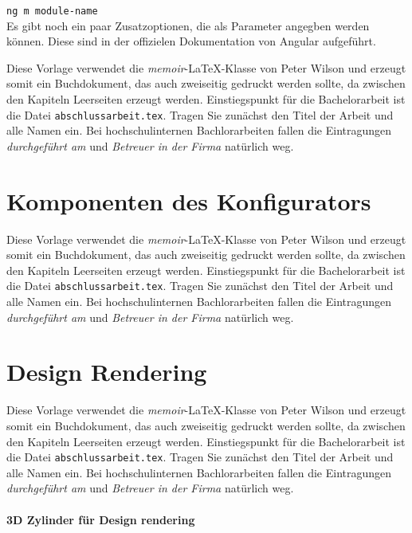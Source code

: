 \texttt{ng m module-name}\\

Es gibt noch ein paar Zusatzoptionen, die als Parameter angegben werden können. Diese sind in der offizielen Dokumentation von Angular aufgeführt.
 
Diese Vorlage verwendet die \textit{memoir}-LaTeX-Klasse von Peter Wilson und erzeugt somit ein Buchdokument, das auch zweiseitig gedruckt werden sollte, da zwischen den Kapiteln Leerseiten erzeugt werden. Einstiegspunkt für die Bachelorarbeit ist die Datei \texttt{abschlussarbeit.tex}. Tragen Sie zunächst den Titel der Arbeit und alle Namen ein. Bei hochschulinternen Bachlorarbeiten fallen die Eintragungen \textit{durchgeführt am} und \textit{Betreuer in der Firma} natürlich weg.

\section{Komponenten des Konfigurators}
\label{sec:umsetzung}
%
Diese Vorlage verwendet die \textit{memoir}-LaTeX-Klasse von Peter Wilson und erzeugt somit ein Buchdokument, das auch zweiseitig gedruckt werden sollte, da zwischen den Kapiteln Leerseiten erzeugt werden. Einstiegspunkt für die Bachelorarbeit ist die Datei \texttt{abschlussarbeit.tex}. Tragen Sie zunächst den Titel der Arbeit und alle Namen ein. Bei hochschulinternen Bachlorarbeiten fallen die Eintragungen \textit{durchgeführt am} und \textit{Betreuer in der Firma} natürlich weg.

\section{Design Rendering}
\label{sec:umsetzung}
%
Diese Vorlage verwendet die \textit{memoir}-LaTeX-Klasse von Peter Wilson und erzeugt somit ein Buchdokument, das auch zweiseitig gedruckt werden sollte, da zwischen den Kapiteln Leerseiten erzeugt werden. Einstiegspunkt für die Bachelorarbeit ist die Datei \texttt{abschlussarbeit.tex}. Tragen Sie zunächst den Titel der Arbeit und alle Namen ein. Bei hochschulinternen Bachlorarbeiten fallen die Eintragungen \textit{durchgeführt am} und \textit{Betreuer in der Firma} natürlich weg. 
\paragraph{3D Zylinder für Design rendering}

